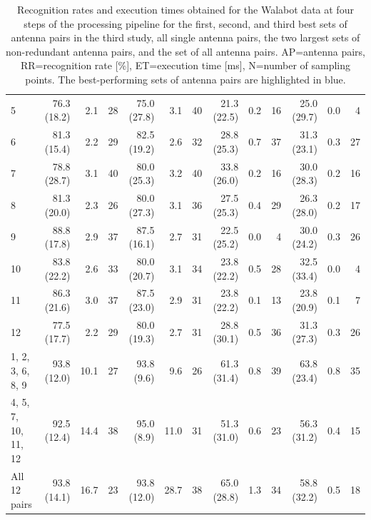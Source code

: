 \begin{table}[bt]
{\begin{tabular}{l|rrr|rrr|rrr|rrr}
		5 & 76.3 (18.2) & 2.1 & 28 &
		75.0 (27.8) & 3.1 & 40 &
		21.3 (22.5) & 0.2 & 16 &
		25.0 (29.7) & 0.0 & 4 \\
		
		6 & 81.3 (15.4) & 2.2 & 29 &
		82.5 (19.2) & 2.6 & 32 &
		28.8 (25.3) & 0.7 & 37 &
		31.3 (23.1) & 0.3 & 27 \\
		
		7 & 78.8 (28.7) & 3.1 & 40 &
		80.0 (25.3) & 3.2 & 40 &
		33.8 (26.0) & 0.2 & 16 &
		30.0 (28.3) & 0.2 & 16 \\
		
		8 & 81.3 (20.0) & 2.3 & 26 &
		80.0 (27.3) & 3.1 & 36 &
		27.5 (25.3) & 0.4 & 29 &
		26.3 (28.0) & 0.2 & 17 \\
		
		9 & 88.8 (17.8) & 2.9 & 37 &
		87.5 (16.1) & 2.7 & 31 &
		22.5 (25.2) & 0.0 & 4 &
		30.0 (24.2) & 0.3 & 26 \\
		
		10 & 83.8 (22.2) & 2.6 & 33 &
	    80.0 (20.7) & 3.1 & 34 &
		23.8 (22.2) & 0.5 & 28 &
		32.5 (33.4) & 0.0 & 4 \\
		
		11 & 86.3 (21.6) & 3.0 & 37 &
		87.5 (23.0) & 2.9 & 31 &
		23.8 (22.2) & 0.1 & 13 &
		23.8 (20.9) & 0.1 & 7 \\
		
		12 & 77.5 (17.7) & 2.2 & 29 &
		80.0 (19.3) & 2.7 & 31 &
		28.8 (30.1) & 0.5 & 36 &
		31.3 (27.3) & 0.3 & 26 \\
		
		1, 2, 3, 6, 8, 9 & \cellcolor{graybluebrighter} 93.8 (12.0) & 10.1 & 27 &
		93.8 (9.6) & 9.6 & 26 &
		61.3 (31.4) & 0.8 & 39 &
		\cellcolor{graybluebrighter} 63.8 (23.4) & 0.8 & 35 \\
		
		4, 5, 7, 10, 11, 12 & 92.5 (12.4) & 14.4 & 38 &
		\cellcolor{graybluebrighter} 95.0 (8.9) & 11.0 & 31 &
		51.3 (31.0) & 0.6 & 23 &
		56.3 (31.2) & 0.4 & 15 \\
		
		All 12 pairs & \cellcolor{graybluebrighter} 93.8 (14.1) & 16.7 & 23 &
		93.8 (12.0) & 28.7 & 38 &
		\cellcolor{graybluebrighter} 65.0 (28.8) & 1.3 & 34 &
		58.8 (32.2) & 0.5 & 18 \\
        \bottomrule
	\end{tabular}
	}
	\caption{Recognition rates and execution times obtained for the Walabot data at four steps of the processing pipeline for the first, second, and third best sets of antenna pairs in the third study, all single antenna pairs, the two largest sets of non-redundant antenna pairs, and the set of all antenna pairs. AP=antenna pairs, RR=recognition rate [\%], ET=execution time [ms], N=number of sampling points. The best-performing sets of antenna pairs are highlighted in blue.}
	\label{tab:radar-experiments:sensors:walabot}
\end{table}

